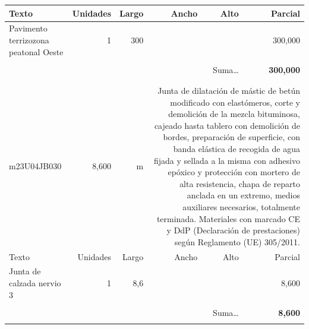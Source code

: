 \documentclass{book}%
\begin{document}
\begin{longtable}{lrrrrr}
Texto&Unidades&Largo&Ancho&Alto&Parcial\\%
\hline%
\multicolumn{1}{p{3.5cm}}{Pavimento terrizozona peatonal  Oeste}&1&300&&&   300,000\\%
&&&&&\\%
\multicolumn{5}{r}{Suma\ldots}&\textbf{   300,000}\\%
\hline%
&&&&&\\%
&&&&&\\%
m23U04JB030&     8,600& m&\multicolumn{3}{p{6cm}}{\scriptsize Junta de dilatación de mástic de betún modificado con elastómeros, corte y demolición de la mezcla bituminosa, cajeado hasta tablero con demolición de bordes, preparación de superficie, con banda elástica de recogida de agua fijada y sellada a la misma con adhesivo epóxico y protección con mortero de alta resistencia, chapa de reparto anclada en un extremo, medios auxiliares necesarios, totalmente terminada. Materiales con marcado CE y DdP (Declaración de prestaciones) según Reglamento (UE) 305/2011.\normalsize}\\%
Texto&Unidades&Largo&Ancho&Alto&Parcial\\%
\hline%
\multicolumn{1}{p{3.5cm}}{Junta de calzada nervio 3 }&1&8,6&&&     8,600\\%
&&&&&\\%
\multicolumn{5}{r}{Suma\ldots}&\textbf{     8,600}\\%
\hline%
&&&&&\\%
\end{longtable}%
\newpage

%
\end{document}
